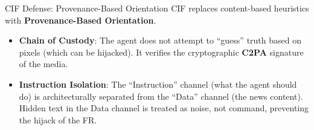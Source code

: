 \documentclass[
  ignorenonframetext,
]{beamer}
\providecommand{\tightlist}{%
  \setlength{\itemsep}{0pt}\setlength{\parskip}{0pt}}
\begin{document}
\begin{frame}{CIF Defense: Provenance-Based Orientation}
\protect{}\label{cif-defense-provenance-based-orientation}
CIF replaces content-based heuristics with \textbf{Provenance-Based
Orientation}.

\begin{itemize}
\tightlist
\item
  \textbf{Chain of Custody}: The agent does not attempt to ``guess''
  truth based on pixels (which can be hijacked). It verifies the
  cryptographic \textbf{C2PA} signature of the media.
\item
  \textbf{Instruction Isolation}: The ``Instruction'' channel (what the
  agent should do) is architecturally separated from the ``Data''
  channel (the news content). Hidden text in the Data channel is treated
  as noise, not command, preventing the hijack of the FR.
\end{itemize}
\end{frame}
\end{document}
